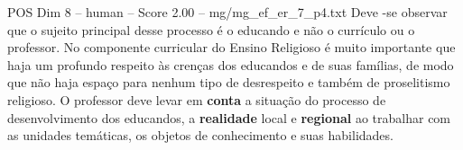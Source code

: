 \begin{textsample}{POS Dim 8 – human – Score 2.00 – mg/mg\_ef\_er\_7\_p4.txt}  \label{ex:f8_pos_017}
Deve -se observar que o sujeito principal desse processo é o educando e não o currículo ou o professor.
No componente curricular do Ensino Religioso é muito importante que haja um profundo respeito às crenças dos educandos e de suas famílias, de modo que não haja espaço para nenhum tipo de desrespeito e também de proselitismo religioso.
O professor deve levar em \textbf{conta} a situação do processo de desenvolvimento dos educandos, a \textbf{realidade} local e \textbf{regional} ao trabalhar com as unidades temáticas, os objetos de conhecimento e suas habilidades.

\end{textsample}
